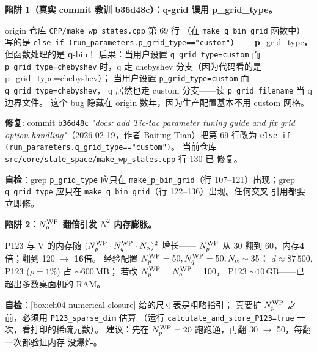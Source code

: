 \begin{pitfallbox}[label={box:ch06-pitfall-commit}]
\textbf{陷阱 1（真实 commit 教训 b36d48c）：q-grid 误用 p\_grid\_type。}

origin 仓库 \texttt{CPP/make\_wp\_states.cpp} 第 69 行
（在 \texttt{make\_q\_bin\_grid} 函数中）写的是
\texttt{else if (run\_parameters.p\_grid\_type=="custom")}——
\textbf{p}\_grid\_type，但函数处理的是 \textbf{q}-bin！
后果：当用户设置 \texttt{q\_grid\_type=custom} 而 \texttt{p\_grid\_type=chebyshev}
时，q 走 chebyshev 分支（因为代码看的是 p\_grid\_type=chebyshev）；
当用户设置 \texttt{p\_grid\_type=custom} 而 \texttt{q\_grid\_type=chebyshev}，
q 居然也走 custom 分支——读 \texttt{p\_grid\_filename} 当 q 边界文件。
这个 bug 隐藏在 origin 数年，因为生产配置基本不用 custom 网格。

\textbf{修复}: commit \texttt{b36d48c} \emph{"docs: add Tic-tac parameter
tuning guide and fix grid option handling"}（2026-02-19，作者 Baiting
Tian）把第 69 行改为 \texttt{else if (run\_parameters.q\_grid\_type=="custom")}。
当前仓库 \texttt{src/core/state\_space/make\_wp\_states.cpp} 行 130 已
修复。

\textbf{自检}：grep \texttt{p\_grid\_type} 应只在
\texttt{make\_p\_bin\_grid}（行 107--121）出现；grep \texttt{q\_grid\_type}
应只在 \texttt{make\_q\_bin\_grid}（行 122--136）出现。任何交叉
引用都要立即修。
\end{pitfallbox}

\begin{pitfallbox}[label={box:ch06-pitfall-N-memory}]
\textbf{陷阱 2：\({N_{p}^{\text{WP}}}\) 翻倍引发 \(N^2\) 内存膨胀。}

P123 与 V 的内存随 \(({N_{p}^{\text{WP}}} \cdot {N_{q}^{\text{WP}}} \cdot N_\alpha)^2\) 增长——
\({N_{p}^{\text{WP}}}\) 从 30 翻到 60，内存\textbf{4}倍；翻到 120 \(\to\) \textbf{16}倍。
经验配置 \({N_{p}^{\text{WP}}} = 50, {N_{q}^{\text{WP}}} = 50, N_\alpha \sim 35\)：
\(d \approx 87\,500\), P123 (\(\rho = 1\%\)) 占
\(\sim 600\,\mathrm{MB}\)；
若改 \({N_{p}^{\text{WP}}} = {N_{q}^{\text{WP}}} = 100\)，
P123 \(\sim 10\,\mathrm{GB}\)——已超出多数桌面机的 RAM。

\textbf{自检}：\cref{box:ch04-numerical-closure} 给的尺寸表是粗略指引；
真要扩 \({N_{p}^{\text{WP}}}\) 之前，必须用 \texttt{P123\_sparse\_dim} 估算
（运行 \texttt{calculate\_and\_store\_P123=true} 一次，看打印的稀疏元数）。
建议：先在 \({N_{p}^{\text{WP}}} = 20\) 跑跑通，再翻 30 \(\to\) 50，每翻一次都验证内存
没爆炸。
\end{pitfallbox}

